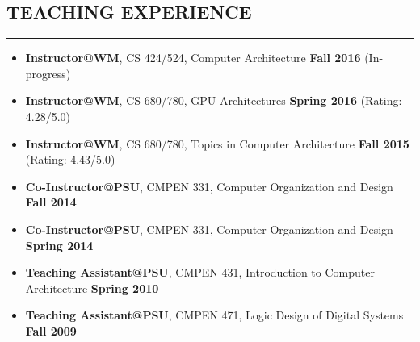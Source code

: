 \documentclass[10pt,a4]{article}
\begin{document}
\subsection*{TEACHING EXPERIENCE}
\hrule
\vspace{0.2cm}
\begin{itemize}
\item{\bf Instructor@WM}, CS 424/524, Computer Architecture \hfill {\bf Fall 2016}  (In-progress)
\item{\bf Instructor@WM}, CS 680/780, GPU Architectures \hfill {\bf Spring 2016}  (Rating: 4.28/5.0)
\item{\bf Instructor@WM}, CS 680/780, Topics in Computer Architecture \hfill {\bf Fall 2015} (Rating: 4.43/5.0)
\item{\bf Co-Instructor@PSU}, CMPEN 331, Computer Organization and Design \hfill {\bf Fall 2014} 
\item{\bf Co-Instructor@PSU}, CMPEN 331, Computer Organization and Design \hfill {\bf Spring 2014} 
\item{\bf Teaching Assistant@PSU}, CMPEN 431, Introduction to Computer Architecture  \hfill {\bf Spring 2010} 
\item{\bf Teaching Assistant@PSU}, CMPEN 471, Logic Design of Digital Systems  \hfill {\bf Fall 2009} 
\end{itemize}
\end{document}

